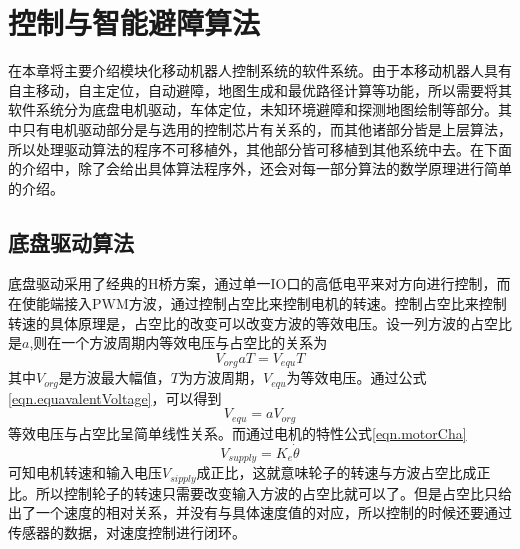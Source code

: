 

\chapter{控制与智能避障算法}
\label{chap:algorithm}

在本章将主要介绍模块化移动机器人控制系统的软件系统。由于本移动机器人具有自主移动，自主定位，自动避障，地图生成和最优路径计算等功能，所以需要将其软件系统分为底盘电机驱动，车体定位，未知环境避障和探测地图绘制等部分。其中只有电机驱动部分是与选用的控制芯片有关系的，而其他诸部分皆是上层算法，所以处理驱动算法的程序不可移植外，其他部分皆可移植到其他系统中去。在下面的介绍中，除了会给出具体算法程序外，还会对每一部分算法的数学原理进行简单的介绍。

\section{底盘驱动算法}
底盘驱动采用了经典的H桥方案，通过单一IO口的高低电平来对方向进行控制，而在使能端接入PWM方波，通过控制占空比来控制电机的转速。控制占空比来控制转速的具体原理是，占空比的改变可以改变方波的等效电压。设一列方波的占空比是$a$,则在一个方波周期内等效电压与占空比的关系为 \\
\begin{equation}\label{eqn.equavalentVoltage}
V_{org}aT=V_{equ}T
\end{equation}
其中$V_{org}$是方波最大幅值，$T$为方波周期，$V_{equ}$为等效电压。通过公式\eqref{eqn.equavalentVoltage}，可以得到\\
\begin{equation}
V_{equ} = aV_{org}
\end{equation}
等效电压与占空比呈简单线性关系。而通过电机的特性公式\eqref{eqn.motorCha} \\
\begin{equation}\label{eqn.motorCha}
V_{supply} = K_{e}\dot{\theta}
\end{equation}
可知电机转速和输入电压$V_{sipply}$成正比，这就意味轮子的转速与方波占空比成正比。所以控制轮子的转速只需要改变输入方波的占空比就可以了。但是占空比只给出了一个速度的相对关系，并没有与具体速度值的对应，所以控制的时候还要通过传感器的数据，对速度控制进行闭环。

